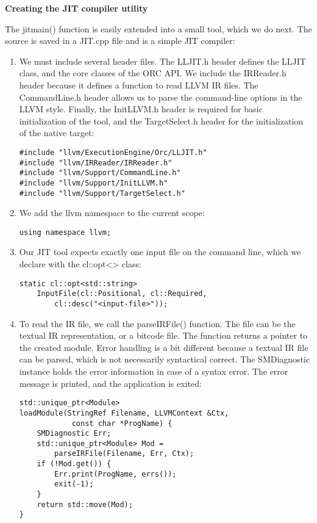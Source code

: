 \hspace*{\fill} \par %
\textbf{Creating the JIT compiler utility}

The jitmain() function is easily extended into a small tool, which we do next. The source is saved in a JIT.cpp file and is a simple JIT compiler:\par

\begin{enumerate}
\item We must include several header files. The LLJIT.h header defines the LLJIT class, and the core classes of the ORC API. We include the IRReader.h header because it defines a function to read LLVM IR files. The CommandLine.h header allows us to parse the command-line options in the LLVM style. Finally, the InitLLVM.h header is required for basic initialization of the tool, and the TargetSelect.h header for the initialization of the native target:
\begin{lstlisting}[caption={}]
#include "llvm/ExecutionEngine/Orc/LLJIT.h"
#include "llvm/IRReader/IRReader.h"
#include "llvm/Support/CommandLine.h"
#include "llvm/Support/InitLLVM.h"
#include "llvm/Support/TargetSelect.h"
\end{lstlisting}

\item We add the llvm namespace to the current scope:
\begin{lstlisting}[caption={}]
using namespace llvm;
\end{lstlisting}

\item Our JIT tool expects exactly one input file on the command line, which we declare with the cl::opt<> class:
\begin{lstlisting}[caption={}]
static cl::opt<std::string>
	InputFile(cl::Positional, cl::Required,
		cl::desc("<input-file>"));
\end{lstlisting}

\item To read the IR file, we call the parseIRFile() function. The file can be the textual IR representation, or a bitcode file. The function returns a pointer to the created module. Error handling is a bit different because a textual IR file can be parsed, which is not necessarily syntactical correct. The SMDiagnostic instance holds the error information in case of a syntax error. The error message is printed, and the application is exited:
\begin{lstlisting}[caption={}]
std::unique_ptr<Module>
loadModule(StringRef Filename, LLVMContext &Ctx,
			const char *ProgName) {
	SMDiagnostic Err;
	std::unique_ptr<Module> Mod =
		parseIRFile(Filename, Err, Ctx);
	if (!Mod.get()) {
		Err.print(ProgName, errs());
		exit(-1);
	}
	return std::move(Mod);
}
\end{lstlisting}


\end{enumerate}
